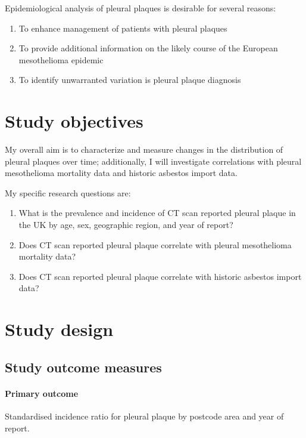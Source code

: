 \documentclass[a4paper,10pt]{article}
\begin{document}
Epidemiological analysis of pleural plaques is desirable for several reasons:

\begin{enumerate}
    \item To enhance management of patients with pleural plaques
    \item To provide additional information on the likely course of the European mesothelioma epidemic\cite{peto1999}  
    \item To identify unwarranted variation is pleural plaque diagnosis  
\end{enumerate}

\section{Study objectives}

My overall aim is to characterize and measure changes in the distribution of pleural plaques over time; additionally, I will investigate correlations with pleural mesothelioma mortality data and historic asbestos import data.

My specific research questions are:

\begin{enumerate}
    \item What is the prevalence and incidence of CT scan reported pleural plaque in the UK by age, sex, geographic region, and year of report?
    \item Does CT scan reported pleural plaque correlate with pleural mesothelioma mortality data?
    \item Does CT scan reported pleural plaque correlate with historic asbestos import data?
\end{enumerate}

\section{Study design}
\subsection{Study outcome measures}

\paragraph{Primary outcome}
Standardised incidence ratio for pleural plaque by postcode area and year of report. 
\end{document}
